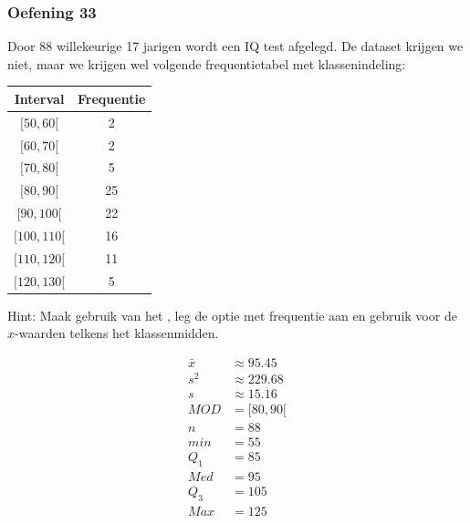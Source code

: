 \documentclass[13pt]{beamer}
\newenvironment{answer}
{\color{blue}}
{\color{black}}
\newcommand{\zrm}[1]{\framebox{#1}}
\begin{document}
\begin{frame}
  \frametitle{Oefening 33}
  Door 88 willekeurige 17 jarigen wordt een IQ test afgelegd. De dataset krijgen we niet, maar we krijgen wel volgende frequentietabel met klassenindeling:\\
  \begin{minipage}{0.6\linewidth}
    \begin{center}
      \begin{tabular}{c|c}
        Interval & Frequentie\\
        \hline
        $[50, 60[$ & 2\\
        $[60, 70[$ & 2\\
        $[70, 80[$ & 5\\
        $[80, 90[$ & 25\\
        $[90, 100[$ & 22\\
        $[100, 110[$ & 16\\
        $[110, 120[$ & 11\\
        $[120, 130[$ & 5
      \end{tabular}
    \end{center}
  Hint: Maak gebruik van het \zrm{ZRM}, leg de optie met frequentie aan en gebruik voor de $x$-waarden telkens het klassenmidden.
  \end{minipage}
  \begin{minipage}{0.35\linewidth}
  \begin{answer}
    \begin{align*}
      \bar{x} & \approx 95.45  \\
      s^2     & \approx 229.68 \\
      s       & \approx 15.16  \\
      MOD     & = [80, 90[     \\
      n       & = 88           \\
      min     & = 55           \\
      Q_1     & = 85           \\
      Med     & = 95           \\
      Q_3     & = 105          \\
      Max     & = 125
    \end{align*}
  \end{answer}
\end{minipage}
\end{frame}
\end{document}
